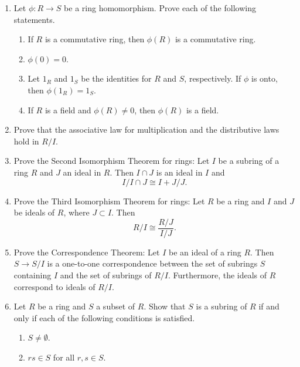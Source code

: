 {\begin{enumerate}
  
\item
Let $\phi : R \rightarrow S$ be a ring homomorphism. Prove each of the
following statements. 
\begin{enumerate}
 
 \item
If $R$ is a commutative ring, then $\phi(R)$ is a commutative ring. 
 
 \item
$\phi( 0 ) = 0$.
 
 \item
Let $1_R$ and $1_S$ be the identities for $R$ and $S$, respectively.
If $\phi$ is onto, then $\phi(1_R) = 1_S$. 
 
 \item
If $R$ is a field and $\phi(R) \neq 0$, then $\phi(R)$ is a field.
 
\end{enumerate}
 
 
\item
Prove that the associative law for multiplication and the distributive
laws hold in $R/I$. 
 
 
\item
Prove the Second Isomorphism Theorem for rings: Let $I$ be a  subring
of a ring $R$  and  $J$ an ideal in $R$.  Then $I \cap J$ is an ideal
in $I$ and 
\[
I / I \cap J \cong I + J /J.
\]
 
 
\item
Prove the Third Isomorphism Theorem for rings: Let $R$ be a ring and
$I$ and $J$ be ideals of $R$, where $J \subset I$.  Then
\[
R/I \cong \frac{R/J}{I/J}.
\]
 
 
\item
Prove the Correspondence Theorem:
Let $I$ be an ideal of a ring $R$. Then $S \rightarrow S/I$ is a
one-to-one correspondence between the set of subrings $S$ containing
$I$  and the set of subrings of $R/I$. Furthermore, the ideals
of $R$ correspond to ideals of $R/I$.

 
 
 
\item
Let $R$ be a ring and $S$ a subset of $R$.  Show that $S$ is a subring
of $R$ if and only if each of the following conditions is satisfied. 
\begin{enumerate}
 
 \item
$S \neq \emptyset$. 
 
 \item
$rs \in S$ for all $r, s \in S$.
 

\end{enumerate}
\end{enumerate}}

